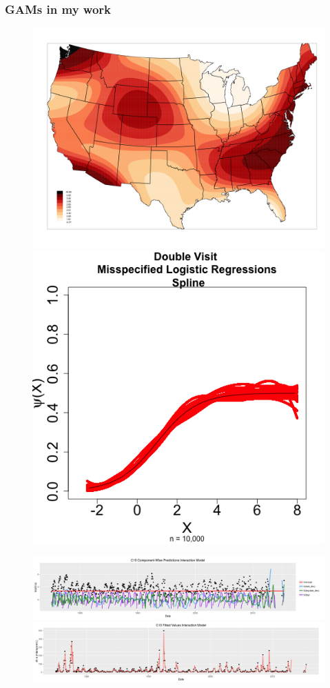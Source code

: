 \documentclass{beamer}
\begin{document}
\begin{frame}
\frametitle{GAMs in my work}


\begin{figure}
\includegraphics[scale=.02]{figures/gamTE3BestNice}
\includegraphics[scale=.2]{figures/logregSplineMisspecifiedExpandRangeDVPsi}


\includegraphics[scale = .2]{figures/sfeiGAM1}
\includegraphics[scale=.2]{figures/sfeiGAM2}


\end{figure}
\end{frame}
\end{document}
